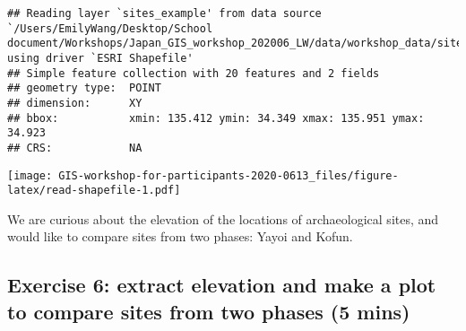 \documentclass[
  xelatex,ja=standard]{bxjsarticle}
\newenvironment{Shaded}{\begin{snugshade}}{\end{snugshade}}
\newcommand{\CommentTok}[1]{\textcolor[rgb]{0.56,0.35,0.01}{\textit{#1}}}
\newcommand{\DataTypeTok}[1]{\textcolor[rgb]{0.13,0.29,0.53}{#1}}
\newcommand{\KeywordTok}[1]{\textcolor[rgb]{0.13,0.29,0.53}{\textbf{#1}}}
\newcommand{\NormalTok}[1]{#1}
\newcommand{\OperatorTok}[1]{\textcolor[rgb]{0.81,0.36,0.00}{\textbf{#1}}}
\newcommand{\StringTok}[1]{\textcolor[rgb]{0.31,0.60,0.02}{#1}}
\begin{document}
\begin{verbatim}
## Reading layer `sites_example' from data source `/Users/EmilyWang/Desktop/School document/Workshops/Japan_GIS_workshop_202006_LW/data/workshop_data/sites_example.shp' using driver `ESRI Shapefile'
## Simple feature collection with 20 features and 2 fields
## geometry type:  POINT
## dimension:      XY
## bbox:           xmin: 135.412 ymin: 34.349 xmax: 135.951 ymax: 34.923
## CRS:            NA
\end{verbatim}

\begin{Shaded}
\end{Shaded}

\texttt{[image: GIS-workshop-for-participants-2020-0613\_files/figure-latex/read-shapefile-1.pdf]}

We are curious about the elevation of the locations of archaeological
sites, and would like to compare sites from two phases: Yayoi and Kofun.

\hypertarget{exercise-6-extract-elevation-and-make-a-plot-to-compare-sites-from-two-phases-5-mins}{%
\subsection{Exercise 6: extract elevation and make a plot to compare
sites from two phases (5
mins)}\label{exercise-6-extract-elevation-and-make-a-plot-to-compare-sites-from-two-phases-5-mins}}
\end{document}
